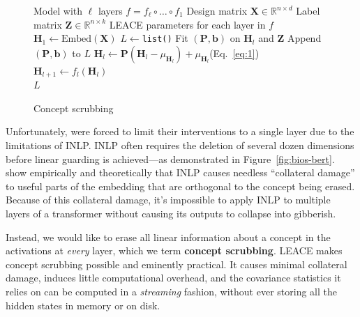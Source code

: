 \documentclass{article}
\theoremstyle{plain}
\theoremstyle{remark}
\theoremstyle{plain}
\theoremstyle{TheoremNum}
\begin{document}
\begin{figure}
\vspace{-40pt}
\begin{minipage}{0.5\textwidth}
\begin{algorithm}[H]
    \caption{Concept scrubbing}
    \begin{algorithmic}[1]
    \Require Model with $\ell$ layers $f = f_\ell \circ \ldots \circ f_1 $
    \Require Design matrix $\mathbf{X} \in \mathbb R^{n \times d}$
    \Require Label matrix $\mathbf{Z} \in \mathbb R^{n \times k}$
    \Ensure LEACE parameters for each layer in $f$
    \State $\mathbf{H}_1 \gets \mathrm{Embed}(\mathbf{X})$
    \State $L \gets $\texttt{list()}
        \State Fit $(\mathbf{P}, \mathbf{b})$ on $\mathbf{H}_{l}$ and $\mathbf{Z}$
        \State Append $(\mathbf{P}, \mathbf{b})$ to $L$
        \State $\mathbf{H}_{l} \gets \mathbf{P}(\mathbf{H}_{l} - \mu_{\mathbf{H}_{l}}) + \mu_{\mathbf{H}_{l}}$\quad(Eq.~\ref{eq:1})
        \State $\mathbf{H}_{l + 1} \gets f_l(\mathbf{H}_{l})$
    \EndFor\\
    \Return $L$
    \end{algorithmic}\label{alg:concept-scrubbing}
\end{algorithm}
\end{minipage}
\end{figure}

Unfortunately, \citet{elazar2021amnesic} were forced to limit their interventions to a single layer due to the limitations of INLP. INLP often requires the deletion of several dozen dimensions before linear guarding is achieved---as demonstrated in Figure~\ref{fig:bios-bert}. \citet{kumar2022probing} show empirically and theoretically that INLP causes needless ``collateral damage'' to useful parts of the embedding that are orthogonal to the concept being erased. Because of this collateral damage, it's impossible to apply INLP to multiple layers of a transformer without causing its outputs to collapse into gibberish.

Instead, we would like to erase all linear information about a concept in the activations at \emph{every} layer, which we term \textbf{concept scrubbing}. LEACE makes concept scrubbing possible and eminently practical. It causes minimal collateral damage, induces little computational overhead, and the covariance statistics it relies on can be computed in a \emph{streaming} fashion, without ever storing all the hidden states in memory or on disk.
\end{document}
